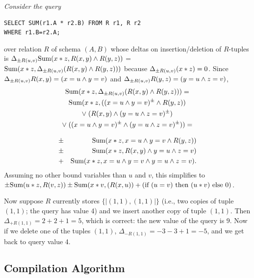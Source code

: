 \begin{example}\em
Consider the query
\begin{verbatim}
SELECT SUM(r1.A * r2.B) FROM R r1, R r2
WHERE r1.B=r2.A;
\end{verbatim}
over relation $R$ of schema $(A,B)$
whose deltas on insertion/deletion of
$R$-tuples is
$\Delta_{\pm R(u,v)} \mbox{Sum}(x*z, R(x,y) \land R(y,z))$ =
$\mbox{Sum}(x*z, \Delta_{\pm R(u,v)} (R(x,y) \land R(y,z)))$
because $\Delta_{\pm R(u,v)} (x*z) = 0$. Since
$\Delta_{\pm R(u,v)} R(x,y) = (x=u \land y=v)$ and
$\Delta_{\pm R(u,v)} R(y,z) = (y=u \land z=v)$,%
%
\begin{multline*}
\mbox{Sum}(x*z, \Delta_{\pm R(u,v)} (R(x,y) \land R(y,z))) = \\
\mbox{Sum}(x*z, ((x=u \land y=v)^\pm \land R(y,z)) \\
\lor\;
 (R(x,y) \land (y=u \land z=v)^\pm) \\
\lor\;
 ((x=u \land y=v)^\pm \land (y=u \land z=v)^\pm)) =
\end{multline*}

\vspace{-6mm}

\begin{eqnarray*}
&\pm& \mbox{Sum}(x*z, x=u \land y=v \land R(y,z)) \\
&\pm& \mbox{Sum}(x*z, R(x,y) \land y=u \land z=v) \\
&+  & \mbox{Sum}(x*z, x=u \land y=v \land y=u \land z=v).
\end{eqnarray*}
Assuming no other bound variables than $u$ and $v$,
this simplifies to
$\pm \mbox{Sum}(u*z, R(v,z))
 \pm \mbox{Sum}(x*v, (R(x,u))
 +   (\mbox{if }(u=v) \mbox{ then }(u*v)\mbox{ else }0)$.

Now suppose $R$ currently stores $\{\!| (1,1), (1,1) |\!\}$
(i.e., two copies of tuple $(1,1)$; the query has value 4)
and we insert another copy of tuple $(1,1)$.
Then $\Delta_{+R(1,1)} = 2 + 2 + 1 = 5$, which is
correct: the new value of the query is 9. Now if we delete one of the tuples
$(1,1)$,
$\Delta_{-R(1,1)} = -3 -3 +1 = -5$, and we get back to query value 4. 
\punto
\end{example}




\subsection{Compilation Algorithm}
\label{sec:compilation-alg}



